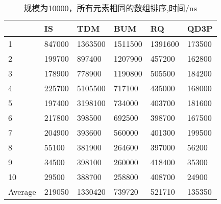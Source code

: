 \documentclass[12pt,a4paper]{ctexart}
\begin{document}
\begin{table}[H]
    \setlength{\abovecaptionskip}{0cm}
    \setlength{\belowcaptionskip}{0.5cm}
    \small
    \centering
    \caption[short]{规模为10000，所有元素相同的数组排序,时间/ns}

    \begin{tabular}{|l|l|l|l|l|l|}
        \hline
                & IS     & TDM     & BUM     & RQ      & QD3P   \\ \hline
        1       & 847000 & 1363500 & 1511500 & 1391600 & 173500 \\ \hline
        2       & 199700 & 897400  & 1207900 & 457200  & 162800 \\ \hline
        3       & 178900 & 778900  & 1190800 & 505500  & 184200 \\ \hline
        4       & 225700 & 5105500 & 717100  & 435000  & 168000 \\ \hline
        5       & 197400 & 3198100 & 734000  & 403700  & 181600 \\ \hline
        6       & 217800 & 398500  & 692500  & 398700  & 167500 \\ \hline
        7       & 204900 & 393600  & 560000  & 401300  & 199500 \\ \hline
        8       & 55100  & 381900  & 264600  & 397000  & 56200  \\ \hline
        9       & 34500  & 398100  & 260000  & 418400  & 35300  \\ \hline
        10      & 29500  & 388700  & 258800  & 408700  & 24900  \\ \hline
        Average & 219050 & 1330420 & 739720  & 521710  & 135350 \\ \hline
    \end{tabular}
\end{table}
\end{document}
